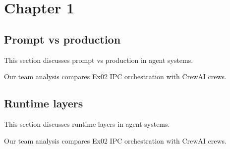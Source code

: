 \section{Chapter 1}

\subsection{Prompt vs production}
This section discusses prompt vs production in agent systems. \cite{crewai2024}

Our team analysis compares Ex02 IPC orchestration with CrewAI crews. \cite{crewai2024}

\subsection{Runtime layers}
This section discusses runtime layers in agent systems. \cite{crewai2024}

Our team analysis compares Ex02 IPC orchestration with CrewAI crews. \cite{crewai2024}
